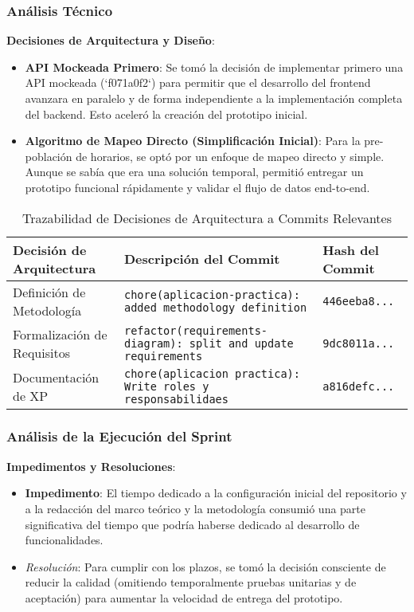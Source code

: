 \subsubsection{Análisis Técnico}

\textbf{Decisiones de Arquitectura y Diseño}:
\begin{itemize}
    \item \textbf{API Mockeada Primero}: Se tomó la decisión de implementar primero una API mockeada (`f071a0f2`) para permitir que el desarrollo del frontend avanzara en paralelo y de forma independiente a la implementación completa del backend. Esto aceleró la creación del prototipo inicial.
    \item \textbf{Algoritmo de Mapeo Directo (Simplificación Inicial)}: Para la pre-población de horarios, se optó por un enfoque de mapeo directo y simple. Aunque se sabía que era una solución temporal, permitió entregar un prototipo funcional rápidamente y validar el flujo de datos end-to-end.
\end{itemize}

\begin{table}[H]
    \caption{Trazabilidad de Decisiones de Arquitectura a Commits Relevantes}
    \label{tab:sprint-2-commit-traceability}
    \begin{tabularx}{\textwidth}{@{}lXl@{}}
        \toprule
        \textbf{Decisión de Arquitectura} & \textbf{Descripción del Commit} & \textbf{Hash del Commit} \\
        \midrule
        Definición de Metodología & \texttt{chore(aplicacion-practica): added methodology definition} & \texttt{446eeba8...} \\
        Formalización de Requisitos & \texttt{refactor(requirements-diagram): split and update requirements} & \texttt{9dc8011a...} \\
        Documentación de XP & \texttt{chore(aplicacion practica): Write roles y responsabilidaes} & \texttt{a816defc...} \\
        \bottomrule
    \end{tabularx}
\end{table}

\subsubsection{Análisis de la Ejecución del Sprint}

\textbf{Impedimentos y Resoluciones}:
\begin{itemize}
    \item \textbf{Impedimento}: El tiempo dedicado a la configuración inicial del repositorio y a la redacción del marco teórico y la metodología consumió una parte significativa del tiempo que podría haberse dedicado al desarrollo de funcionalidades.
    \item \textit{Resolución}: Para cumplir con los plazos, se tomó la decisión consciente de reducir la calidad (omitiendo temporalmente pruebas unitarias y de aceptación) para aumentar la velocidad de entrega del prototipo.
\end{itemize}

